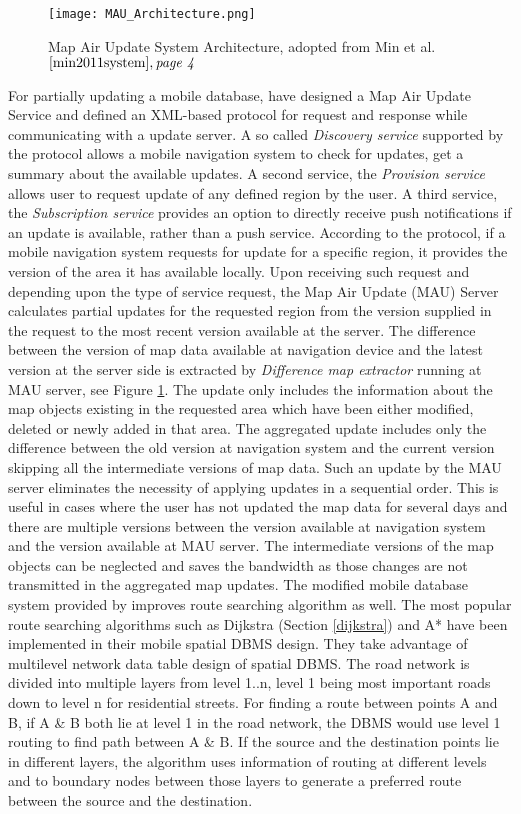 \begin{figure}
\centering
\texttt{[image: MAU\_Architecture.png]}
\caption{Map Air Update System Architecture, adopted from Min et al.$\cite{min2011system}, \textit{page 4}$}
\label{fg:maus}
\end{figure}
For partially updating a mobile database, \citet{min2011system} have designed a Map Air Update Service and defined an XML-based protocol for request and response while communicating with a update server. A so called \textit{Discovery service} supported by the protocol allows a mobile navigation system to check for updates, get a summary about the available updates. A second service, the \textit{Provision service} allows user to request update of any defined region by the user. A third service, the \textit{Subscription service} provides an option to directly receive push notifications if an update is available, rather than a push service. According to the protocol, if a mobile navigation system requests for update for a specific region, it provides the version of the area it has available locally. Upon receiving such request and depending upon the type of service request, the Map Air Update (MAU) Server calculates partial updates for the requested region from the version supplied in the request to the most recent version available at the server. The difference between the version of map data available at navigation device and the latest version at the server side is extracted by \textit{Difference map extractor} running at MAU server, see Figure \ref{fg:maus}. The update only includes the information about the map objects existing in the requested area which have been either modified, deleted or newly added in that area. The aggregated update includes only the difference between the old version at navigation system and the current version skipping all the intermediate versions of map data. Such an update by the MAU server eliminates the necessity of applying updates in a sequential order. This is useful in cases where the user has not updated the map data for several days and there are multiple versions between the version available at navigation system and the version available at MAU server. The intermediate versions of the map objects can be neglected and saves the bandwidth as those changes are not transmitted in the aggregated map updates. The modified mobile database system provided by \citet{min2011system} improves route searching algorithm as well. The most popular route searching algorithms such as Dijkstra (Section \ref{dijkstra}) and A* have been implemented in their mobile spatial DBMS design. They take advantage of multilevel network data table design of spatial DBMS. The road network is divided into multiple layers from level 1..n, level 1 being most important roads down to level n for residential streets. For finding a route between points A and B, if A \& B both lie at level 1 in the road network, the DBMS would use level 1 routing to find path between A \& B. If the source and the destination points lie in different layers, the algorithm uses information of routing at different levels and to boundary nodes between those layers to generate a preferred route between the source and the destination.



